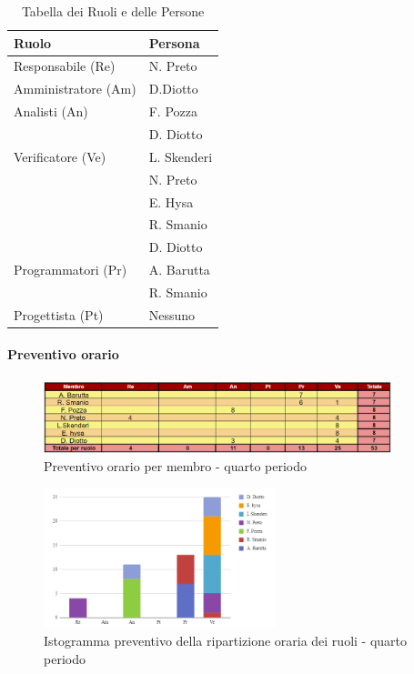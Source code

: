 \begin{table}[H]
    \centering
    \begin{tabular}{|l|l|}
    \hline
    \textbf{Ruolo} & \textbf{Persona} \\
    \hline
    \hline
    Responsabile (Re) & N. Preto \\
    \hline
    Amministratore (Am) & D.Diotto \\
    \hline
    Analisti (An) & F. Pozza\\
    & D. Diotto \\
    \hline
    Verificatore (Ve) & L. Skenderi \\
     &  N. Preto  \\&  E. Hysa\\&  R. Smanio\\&  D. Diotto  \\
     \hline
    Programmatori (Pr) & A. Barutta \\
     & R. Smanio \\
     \hline
    Progettista (Pt) & Nessuno \\
    \hline
    \end{tabular}
    \caption{Tabella dei Ruoli e delle Persone}
    \label{tab:Ruoli_persone_4}
    \end{table}
    

\paragraph*{Preventivo orario} \hspace{1pt}

\begin{figure}[H]
    \centering
    \includegraphics[width=0.9\textwidth]{../Images/preventivoOrario4Periodo.png}
    \caption{Preventivo orario per membro - quarto periodo}
    \label{fig:Preventivo_orario_4}
\end{figure}

\begin{figure}[H]
    \centering
    \includegraphics[width=0.6\textwidth]{../Images/preventivoDivisioneRuoli4Periodo.png}
    \caption{Istogramma preventivo della ripartizione oraria dei ruoli - quarto periodo}
    \label{fig:Preventivo_ripartizione_oraria_4}
\end{figure}

